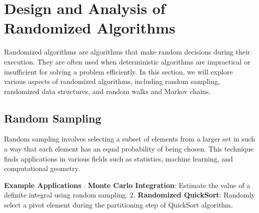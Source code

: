 \documentclass[12pt]{book} %
\begin{document}
\section{Design and Analysis of Randomized Algorithms}
Randomized algorithms are algorithms that make random decisions during their execution. They are often used when deterministic algorithms are impractical or insufficient for solving a problem efficiently. In this section, we will explore various aspects of randomized algorithms, including random sampling, randomized data structures, and random walks and Markov chains.

\subsection{Random Sampling}
Random sampling involves selecting a subset of elements from a larger set in such a way that each element has an equal probability of being chosen. This technique finds applications in various fields such as statistics, machine learning, and computational geometry.

\textbf{Example Applications}
. \textbf{Monte Carlo Integration}: Estimate the value of a definite integral using random sampling.
2. \textbf{Randomized QuickSort}: Randomly select a pivot element during the partitioning step of QuickSort algorithm.
\end{document}

